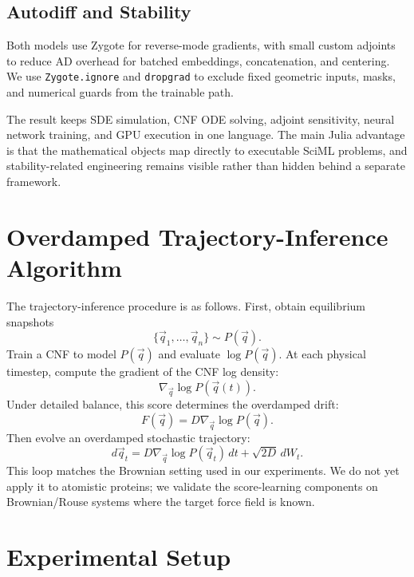 \documentclass[reprint,amsmath,amssymb,aps,pra,10pt]{revtex4-2}
\begin{document}
\subsection*{Autodiff and Stability}

Both models use Zygote for reverse-mode gradients, with small custom adjoints to reduce AD overhead for batched embeddings, concatenation, and centering.
We use \texttt{Zygote.ignore} and \texttt{dropgrad} to exclude fixed geometric inputs, masks, and numerical guards from the trainable path.

The result keeps SDE simulation, CNF ODE solving, adjoint sensitivity, neural network training, and GPU execution in one language.
The main Julia advantage is that the mathematical objects map directly to executable SciML problems, and stability-related engineering remains visible rather than hidden behind a separate framework.

\section{Overdamped Trajectory-Inference Algorithm}

The trajectory-inference procedure is as follows.
First, obtain equilibrium snapshots
\begin{equation}
    \{\vec{q}_1,\ldots,\vec{q}_n\}
    \sim
    P(\vec{q}).
\end{equation}
Train a CNF to model $P(\vec{q})$ and evaluate $\log P(\vec{q})$.
At each physical timestep, compute the gradient of the CNF log density:
\begin{equation}
    \nabla_{\vec{q}} \log P(\vec{q}(t)).
\end{equation}
Under detailed balance, this score determines the overdamped drift:
\begin{equation}
    F(\vec{q})
    =
    D\nabla_{\vec{q}}\log P(\vec{q}).
\end{equation}
Then evolve an overdamped stochastic trajectory:
\begin{equation}
    d\vec{q}_t
    =
    D\nabla_{\vec{q}}\log P(\vec{q}_t)\,dt
    +
    \sqrt{2D}\,dW_t.
\end{equation}
This loop matches the Brownian setting used in our experiments.
We do not yet apply it to atomistic proteins; we validate the score-learning components on Brownian/Rouse systems where the target force field is known.

\section{Experimental Setup}
\end{document}
